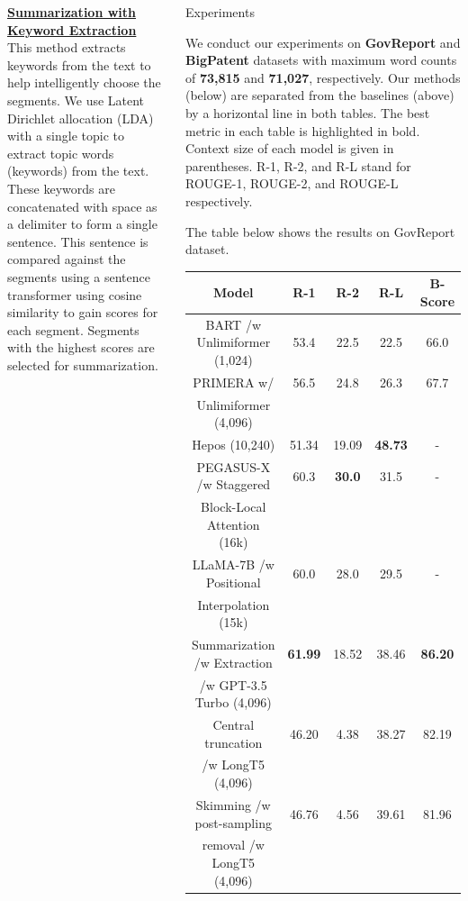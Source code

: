 \documentclass[20pt]{beamer}
\newcommand{\heading}[1]{\ul{\textbf{#1}} \\}
\begin{document}
\begin{frame}[t]
\begin{columns}[t]
  \vspace{.8cm}
  \begin{minipage}{\columnwidth}
    \heading{Summarization with Keyword Extraction}
    This method extracts keywords from the text to help intelligently choose the segments.
    We use Latent Dirichlet allocation (LDA) with a single topic to extract topic words (keywords) from the text.
    These keywords are concatenated with space as a delimiter to form a single sentence.
    This sentence is compared against the segments using a sentence transformer using cosine similarity to gain scores for each segment.
    Segments with the highest scores are selected for summarization.
  \end{minipage}

  \begin{block}{Experiments}

    We conduct our experiments on \textbf{GovReport} and \textbf{BigPatent} datasets with maximum word counts of \textbf{73,815} and \textbf{71,027}, respectively.
    Our methods (below) are separated from the baselines (above) by a horizontal line in both tables.
    The best metric in each table is highlighted in bold.
    Context size of each model is given in parentheses.
    R-1, R-2, and R-L stand for ROUGE-1, ROUGE-2, and ROUGE-L respectively.

    The table below shows the results on GovReport dataset.

    \begin{table}[!ht]
      \centering
      \small

      \begin{tabular}{c c c c c}
        \hline
        Model & R-1 & R-2 & R-L & B-Score \\
        \hline
        BART /w Unlimiformer (1,024) & 53.4 & 22.5 & 22.5 & 66.0 \\
        PRIMERA w/ & 56.5 & 24.8 & 26.3 & 67.7 \\
        Unlimiformer (4,096) & & & & \\
        Hepos (10,240) & 51.34 & 19.09 & \textbf{48.73} & - \\
        PEGASUS-X /w Staggered & 60.3 & \textbf{30.0} & 31.5 & - \\
        Block-Local Attention (16k) & & & & \\
        LLaMA-7B /w Positional & 60.0 & 28.0 & 29.5 & - \\
        Interpolation (15k) & & & & \\
        \hline
        Summarization /w Extraction & \textbf{61.99} & 18.52 & 38.46 & \textbf{86.20} \\
        /w GPT-3.5 Turbo (4,096) & & & & \\
        Central truncation & 46.20 & 4.38 & 38.27 & 82.19 \\
        /w LongT5 (4,096) & & & & \\
        Skimming /w post-sampling & 46.76 & 4.56 & 39.61 & 81.96 \\
        removal /w LongT5 (4,096) & & & & \\
        \hline
      \end{tabular}


\end{table}
\end{block}
\end{columns}
\end{frame}
\end{document}
